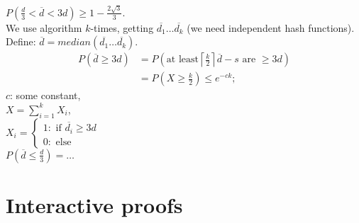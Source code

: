 \documentclass[a4paper, 12pt]{book}
\theoremstyle{definition}
\theoremstyle{remark}
\begin{document}
$P\left(\frac{d}{3} < \overline{d} < 3d\right) \geq 1 - \frac{2 \sqrt{3}}{3}$. \\
We use algorithm $k$-times, getting $\overline{d_1} \dots \overline{d_k}$ (we need independent hash functions). \\
Define: $\overline{d} = median(\overline{d_1} \dots \overline{d_k})$. \\
\begin{align*}
  P(\overline{d} \geq 3d) &=
  P\left(\text{at least} \left\lceil \frac{k}{2} \right\rceil \overline{d}-s \text{ are } \geq 3d\right) \\
  &= P\left(X \geq \frac{k}{2}\right) \leq e^{-ck};
\end{align*}
$c$: some constant, \\
$X = \sum_{i=1}^{k} X_i$, \\
$X_i = \begin{cases}
  1: \text{ if } \overline{d_i} \geq 3d \\
  0: \text{ else}
\end{cases}$ \\
$P\left(\overline{d} \leq \frac{d}{3}\right) = \dots$



\chapter{Interactive proofs}
\end{document}
